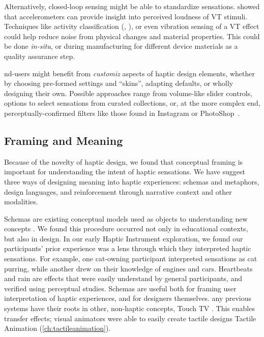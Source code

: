Alternatively, closed-loop sensing might be able to standardize sensations.
\citet{Blum2015} showed that accelerometers can provide insight into perceived loudness of VT stimuli.
Techniques like activity classification (\eg, \cite{Schneider2013}), or even vibration sensing of a VT effect could help reduce noise from physical changes and material properties.
This could be done \emph{in-situ}, or during manufacturing for different device materials as a quality assurance step.

nd-users might benefit from \textit{customiz} aspects of haptic design elements, whether by choosing pre-formed settings and ``skins'', adapting defaults, or wholly designing their own. 
Possible approaches range from volume-like slider controls, options to select sensations from curated collections, or, at the more complex end, perceptually-confirmed filters like those found in Instagram or PhotoShop~\cite{Seifi2014,Seifi2015,SchneiderAsiaHaptics2014}.


%
%
\subsection{Framing and Meaning}
Because of the novelty of haptic design, we found that conceptual framing is important for understanding the intent of haptic sensations.
We have suggest three ways of designing meaning into haptic experiences:
schemas and metaphors,
design languages,
and reinforcement through narrative context and other modalities.



Schemas are existing conceptual models used as  objects to understanding new concepts \cite{Papert1980}.
We found this procedure occurred not only in educational contexts, but also in design.
In our early Haptic Instrument exploration, we found our participants' prior experience was a lens through which they interpreted haptic sensations.
For example, one cat-owning participant interpreted sensations as cat purring, while another drew on their knowledge of engines and cars.
Heartbeats and rain \cite{Israr2014} are effects that were easily understand by general participants, and verified using perceptual studies.
Schemas are useful both for framing user interpretation of haptic experiences, and for designers themselves.
any previous systems have their roots in other, non-haptic concepts, \eg Touch TV \cite{Modhrain2001}.
This enables transfer effects; visual animators were able to easily create tactile designs  Tactile Animation (\autoref{ch:tactileanimation}).

